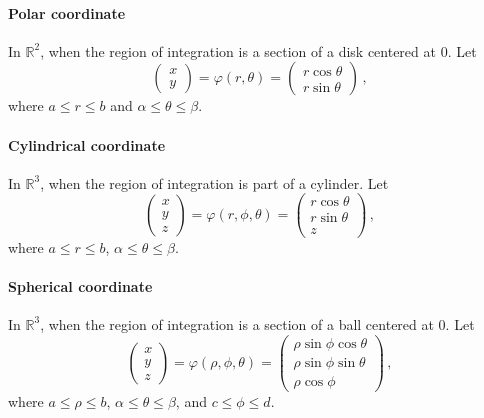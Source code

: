 \documentclass[
]{article}
\theoremstyle{definition}
\theoremstyle{definition}
\theoremstyle{definition}
\theoremstyle{definition}
\theoremstyle{remark}
\begin{document}
\hypertarget{polar-coordinate}{%
\paragraph{Polar coordinate}\label{polar-coordinate}}

In \(\mathbb{R}^2\),
when the region of integration is a section of a disk centered at \(0\).
Let
\begin{equation*}
    \begin{pmatrix}
        x \\ y
    \end{pmatrix}
    =
    \varphi(r,\theta) = 
    \begin{pmatrix}
        r\cos\theta \\
        r\sin\theta 
    \end{pmatrix} \,,
\end{equation*}
where \(a \leq r \leq b\) and \(\alpha \leq \theta \leq \beta\).

\hypertarget{cylindrical-coordinate}{%
\paragraph{Cylindrical coordinate}\label{cylindrical-coordinate}}

In \(\mathbb{R}^3\), when the region of integration is part of a cylinder.
Let
\begin{equation*}
    \begin{pmatrix}
        x \\ y \\z
    \end{pmatrix}
    =
    \varphi(r,\phi,\theta) = 
    \begin{pmatrix}
        r\cos\theta\\
        r\sin\theta\\
        z
    \end{pmatrix} \,,
\end{equation*}
where \(a \leq r \leq b\), \(\alpha \leq \theta \leq \beta\).

\hypertarget{spherical-coordinate}{%
\paragraph{Spherical coordinate}\label{spherical-coordinate}}

In \(\mathbb{R}^3\), when the region of integration is a section of a ball centered at \(0\).
Let
\begin{equation*}
    \begin{pmatrix}
        x \\ y \\z
    \end{pmatrix}
    =
    \varphi(\rho,\phi,\theta) = 
    \begin{pmatrix}
        \rho\sin\phi\cos\theta\\
        \rho\sin\phi\sin\theta\\
        \rho \cos\phi
    \end{pmatrix} \,,
\end{equation*}
where \(a \leq \rho \leq b\), \(\alpha \leq \theta \leq \beta\), and
\(c \leq \phi \leq d\).
\end{document}
